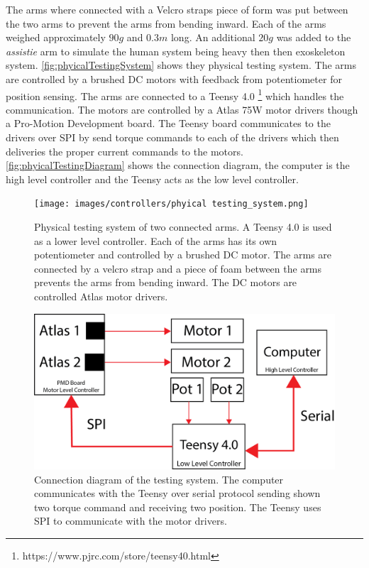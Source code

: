  The arms where connected with a Velcro straps piece of form was put between the two arms to prevent the arms from bending inward. Each of the arms weighed approximately $90g$ and $0.3m$ long. An additional $20g$ was added to the \textit{assistie} arm to simulate the human system being heavy then then exoskeleton system. \autoref{fig:phyicalTestingSystem} shows they physical testing system. The arms are controlled by a brushed DC motors with feedback from potentiometer for position sensing. The arms are connected to a Teensy 4.0 \footnote{https://www.pjrc.com/store/teensy40.html} which handles the communication. The motors are controlled by a Atlas 75W motor drivers though a Pro-Motion Development board. The Teensy board communicates to the drivers over SPI by send torque commands to each of the drivers which then deliveries the proper current commands to the motors. \autoref{fig:phyicalTestingDiagram} shows the connection diagram, the computer is the high level controller and the Teensy acts as the low level controller. 


\begin{figure}
    \centering
    \texttt{[image: images/controllers/phyical testing\_system.png]}
    \caption[Physical Testing System]{Physical testing system of two connected arms. A Teensy 4.0 is used as a lower level controller. Each of the arms has its own potentiometer and controlled by a brushed DC motor. The arms are connected by a velcro strap and a piece of foam between the arms prevents the arms from bending inward. The DC motors are controlled Atlas motor drivers. }
    \label{fig:phyicalTestingSystem}
\end{figure}


\begin{figure}
    \centering
    \includegraphics[width=\linewidth]{images/controllers/testing_system_diagam.png}
    \caption[Testing System Diagram]{Connection diagram of the testing system. The computer communicates with the Teensy over serial protocol sending shown two torque command and receiving two position. The Teensy uses SPI to communicate with the motor drivers. }
    \label{fig:phyicalTestingDiagram}
\end{figure}





